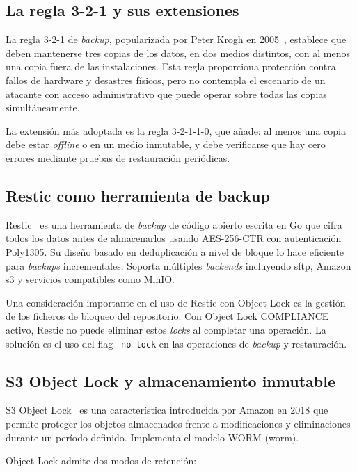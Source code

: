 \documentclass[../main.tex]{subfiles}
\begin{document}
\subsection{La regla 3-2-1 y sus extensiones}

La regla 3-2-1 de \textit{backup}, popularizada por Peter Krogh en
2005~\cite{krogh2005}, establece que deben mantenerse tres copias de los
datos, en dos medios distintos, con al menos una copia fuera de las
instalaciones. Esta regla proporciona protección contra fallos de hardware
y desastres físicos, pero no contempla el escenario de un atacante con
acceso administrativo que puede operar sobre todas las copias
simultáneamente.

La extensión más adoptada es la regla 3-2-1-1-0, que añade: al menos una
copia debe estar \textit{offline} o en un medio inmutable, y debe
verificarse que hay cero errores mediante pruebas de restauración periódicas.

\subsection{Restic como herramienta de backup}

Restic~\cite{restic2024} es una herramienta de \textit{backup} de código
abierto escrita en Go que cifra todos los datos antes de almacenarlos
usando AES-256-CTR con autenticación Poly1305. Su diseño basado en
deduplicación a nivel de bloque lo hace eficiente para \textit{backups}
incrementales. Soporta múltiples \textit{backends} incluyendo \gls{sftp},
Amazon \gls{s3} y servicios compatibles como MinIO.

Una consideración importante en el uso de Restic con Object Lock es la
gestión de los ficheros de bloqueo del repositorio. Con Object Lock
COMPLIANCE activo, Restic no puede eliminar estos \textit{locks} al
completar una operación. La solución es el uso del flag
\texttt{--no-lock} en las operaciones de \textit{backup} y restauración.

\subsection{S3 Object Lock y almacenamiento inmutable}

S3 Object Lock~\cite{aws2023} es una característica introducida por Amazon
en 2018 que permite proteger los objetos almacenados frente a modificaciones
y eliminaciones durante un período definido. Implementa el modelo WORM
(\gls{worm}).

Object Lock admite dos modos de retención:
\end{document}
